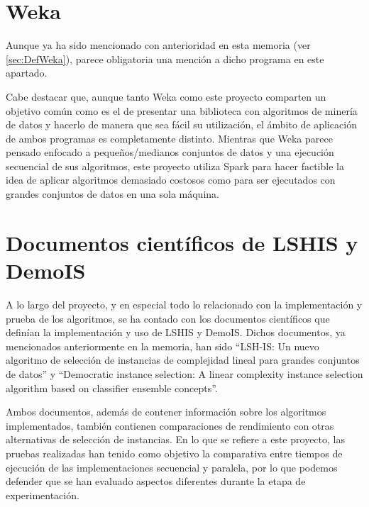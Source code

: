 

\section{Weka}

Aunque ya ha sido mencionado con anterioridad en esta memoria (ver \ref{sec:DefWeka}), parece obligatoria una mención a dicho programa en este apartado.

Cabe destacar que, aunque tanto Weka como este proyecto comparten un objetivo común como es el de presentar una biblioteca con algoritmos de minería de datos y hacerlo de manera que sea fácil su utilización, el ámbito de aplicación de ambos programas es completamente distinto. Mientras que Weka parece pensado enfocado a pequeños/medianos conjuntos de datos y una ejecución secuencial de sus algoritmos, este proyecto utiliza Spark para hacer factible la idea de aplicar algoritmos demasiado costosos como para ser ejecutados con grandes conjuntos de datos en una sola máquina.

\section{Documentos científicos de LSHIS y DemoIS}

A lo largo del proyecto, y en especial todo lo relacionado con la implementación y prueba de los algoritmos, se ha contado con los documentos científicos que definían la implementación y uso de LSHIS y DemoIS. Dichos documentos, ya mencionados anteriormente en la memoria, han sido ``LSH-IS: Un nuevo algoritmo de selección de instancias de complejidad lineal para grandes conjuntos de datos''\cite{LSHISPaper} y ``Democratic instance selection: A linear complexity instance selection algorithm based on classifier ensemble concepts''\cite{DemoISPaper}.

Ambos documentos, además de contener información sobre los algoritmos implementados, también contienen comparaciones de rendimiento con otras alternativas de selección de instancias. En lo que se refiere a este proyecto, las pruebas realizadas han tenido como objetivo la comparativa entre tiempos de ejecución de las implementaciones secuencial y paralela, por lo que podemos defender que se han evaluado aspectos diferentes durante la etapa de experimentación. 

